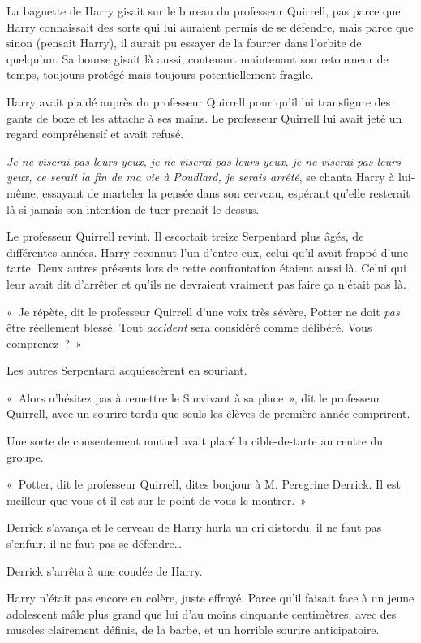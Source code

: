 La baguette de Harry gisait sur le bureau du professeur Quirrell, pas parce que Harry connaissait des sorts qui lui auraient permis de se défendre, mais parce que sinon (pensait Harry), il aurait pu essayer de la fourrer dans l'orbite de quelqu'un.
Sa bourse gisait là aussi, contenant maintenant son retourneur de temps, toujours protégé mais toujours potentiellement fragile.

Harry avait plaidé auprès du professeur Quirrell pour qu'il lui transfigure des gants de boxe et les attache à ses mains.
Le professeur Quirrell lui avait jeté un regard compréhensif et avait refusé.

\emph{Je ne viserai pas leurs yeux, je ne viserai pas leurs yeux, je ne viserai pas leurs yeux, ce serait la fin de ma vie à Poudlard, je serais arrêté}, se chanta Harry à lui-même, essayant de marteler la pensée dans son cerveau, espérant qu'elle resterait là si jamais son intention de tuer prenait le dessus.

Le professeur Quirrell revint.
Il escortait treize Serpentard plus âgés, de différentes années.
Harry reconnut l'un d'entre eux, celui qu'il avait frappé d'une tarte.
Deux autres présents lors de cette confrontation étaient aussi là.
Celui qui leur avait dit d'arrêter et qu'ils ne devraient vraiment pas faire ça n'était pas là.

«~Je répète, dit le professeur Quirrell d'une voix très sévère, Potter ne doit \emph{pas} être réellement blessé.
Tout \emph{accident} sera considéré comme délibéré.
Vous comprenez~?~»

Les autres Serpentard acquiescèrent en souriant.

«~Alors n'hésitez pas à remettre le Survivant à sa place~», dit le professeur Quirrell, avec un sourire tordu que seuls les élèves de première année comprirent.

Une sorte de consentement mutuel avait placé la cible-de-tarte au centre du groupe.

«~Potter, dit le professeur Quirrell, dites bonjour à M. Peregrine Derrick.
Il est meilleur que vous et il est sur le point de vous le montrer.~»

Derrick s'avança et le cerveau de Harry hurla un cri distordu, il ne faut pas s'enfuir, il ne faut pas se défendre…

Derrick s'arrêta à une coudée de Harry.

Harry n'était pas encore en colère, juste effrayé.
Parce qu'il faisait face à un jeune adolescent mâle plus grand que lui d'au moins cinquante centimètres, avec des muscles clairement définis, de la barbe, et un horrible sourire anticipatoire.

